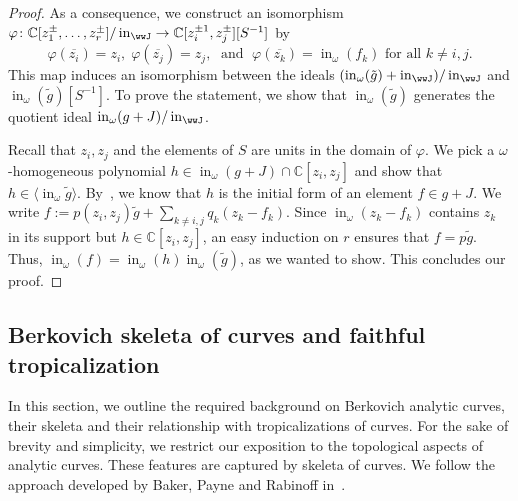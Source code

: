 \documentclass[11pt]{amsart}
\numberwithin{equation}{section}
\theoremstyle{plain}
\theoremstyle{definition}
\theoremstyle{remark}
\begin{document}
\begin{proof}
As a consequence, we construct an isomorphism $\varphi\colon
{\mathbb{C}}[z_1^{\pm}, \ldots, z_r^{\pm}]/\operatorname{in}_\wwJ \to {\mathbb{C}}[z_i^{\pm 1},
z_j^{\pm}] [S^{-1}]$ by
\begin{equation}
  \label{eq:mapLocalCoord}
  \varphi(\overline{z_i})=z_i, \; \varphi(\overline{z_j})=z_j ,\; \text{ and }\; \varphi(\overline{z_k})=\operatorname{in}_{\omega}(f_k) \text{ for all }k\neq i,j.
\end{equation}
This map induces an isomorphism between the ideals
$(\operatorname{in}_{\omega}(\tilde{g})+\operatorname{in}_\wwJ)/\operatorname{in}_\wwJ$ and
$\operatorname{in}_{\omega}(\tilde{g})[S^{-1}]$.  To prove the statement, we show
that $\operatorname{in}_{\omega}(\tilde{g})$ generates the quotient ideal
$\operatorname{in}_{\omega}(g+J)/\operatorname{in}_\wwJ$.  

Recall that $z_i,z_j$ and the elements of $S$ are units in the domain
of $\varphi$. We pick a ${\omega}$-homogeneous polynomial $h\in
\operatorname{in}_{\omega}(g+J)\cap {\mathbb{C}}[z_i, z_j]$ and show that $h\in \langle
\operatorname{in}_{\omega}\tilde{g}\rangle $.  By~\cite[Lemma 2.12]{FJT07}, we know
that $h$ is the initial form of an element $f\in g+J$. We write
$f:=p(z_i,z_j)\tilde{g} + \sum_{k\neq i,j} q_k(z_k-f_k)$.  Since
$\operatorname{in}_{\omega}(z_k-f_k)$ contains $z_k$ in its support but $h\in
{\mathbb{C}}[z_i,z_j]$, an easy induction on $r$ ensures that
$f=p\tilde{g}$. Thus,
$\operatorname{in}_{\omega}(f)=\operatorname{in}_{\omega}(h)\operatorname{in}_{\omega}(\tilde{g})$, as we wanted to
show. This concludes our proof.
\end{proof}

\subsection{Berkovich skeleta of curves and faithful tropicalization}\label{sec:berk-skel-curv}

In this section, we outline the required background on Berkovich
analytic curves, their skeleta and their relationship with
tropicalizations of curves. For the sake of brevity and simplicity, we
restrict our exposition to the topological aspects of analytic
curves. These features are captured by skeleta of curves. We follow
the approach developed by Baker, Payne and Rabinoff
in~\cite{BPR11,BPRContempMath}.
\end{document}
